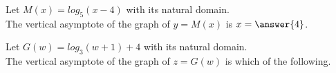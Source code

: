 \documentclass{ximera}
\author{Lee Wayand}
\begin{document}
\begin{exercise}







\begin{question}

Let $M(x) = log_5(x-4)$ with its natural domain. \\

The vertical asymptote of the graph of $y = M(x)$ is $x = \answer{4}$.


\end{question}








\begin{question}

Let $G(w) = log_3(w+1) + 4$ with its natural domain. \\

The vertical asymptote of the graph of $z = G(w)$ is which of the following.



\begin{multipleChoice}
\end{multipleChoice}


\end{question}





















\end{exercise}
\end{document}
